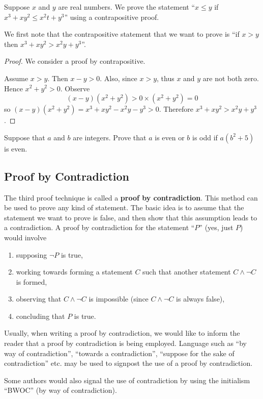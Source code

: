 \begin{example}
    Suppose $x$ and $y$ are real numbers. We prove the statement ``$x \leq y$ if $x^3 + xy^2 \leq x^2t + y^3$'' using a contrapositive proof.
    
    We first note that the contrapositive statement that we want to prove is ``if $x > y$ then $x^3 + xy^2 > x^2y + y^3$''.
    \begin{proof}
        We consider a proof by contrapositive.
        
        Assume $x > y$. Then $x - y > 0$. Also, since $x > y$, thus $x$ and $y$ are not both zero. Hence $x^2 + y^2 > 0$.
        Observe
        \[
            (x-y)(x^2+y^2) > 0 \times (x^2+y^2) = 0        
        \]
        so $(x-y)(x^2+y^2) = x^3 + xy^2 - x^2y - y^3 > 0$. Therefore $x^3 + xy^2 > x^2y + y^3$.
    \end{proof}
\end{example}

\begin{exercise}
    Suppose that $a$ and $b$ are integers. Prove that $a$ is even or $b$ is odd if $a(b^2 + 5)$ is even.
\end{exercise}

\subsection{Proof by Contradiction}
The third proof technique is called a \textbf{proof by contradiction}. This method can be used to prove any kind of statement. The basic idea is to assume that the statement we want to prove is false, and then show that this assumption leads to a contradiction. A proof by contradiction for the statement ``$P$'' (yes, just $P$) would involve
\begin{enumerate}
    \item supposing $\lnot P$ is true,
    \item working towards forming a statement $C$ such that another statement $C \land \lnot C$ is formed,
    \item observing that $C \land \lnot C$ is impossible (since $C \land \lnot C$ is always false),
    \item concluding that $P$ is true.
\end{enumerate}
Usually, when writing a proof by contradiction, we would like to inform the reader that a proof by contradiction is being employed. Language such as ``by way of contradiction'', ``towards a contradiction'', ``suppose for the sake of contradiction'' etc. may be used to signpost the use of a proof by contradiction.
\begin{remark}
    Some authors would also signal the use of contradiction by using the initialism ``BWOC'' (by way of contradiction). 
\end{remark}


